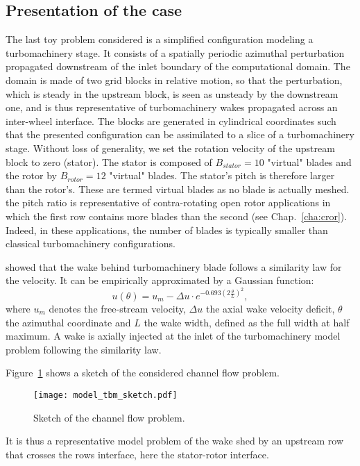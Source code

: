 
\subsection{Presentation of the case}

The last toy problem considered is a simplified 
configuration modeling a turbomachinery 
stage. It consists of a spatially 
periodic azimuthal perturbation propagated downstream 
of the inlet boundary of the computational domain. 
The domain is made of two grid blocks in relative 
motion, so that the perturbation, which is steady 
in the upstream block, is seen as unsteady by the 
downstream one, and is thus representative of 
turbomachinery wakes propagated across an inter-wheel interface.
The blocks are generated in cylindrical
coordinates such that the presented configuration
can be assimilated to a slice of 
a turbomachinery stage.
Without loss of generality, 
we set the rotation velocity of the upstream block to zero (stator). 
The stator is composed of $B_{stator} = 10$
"virtual" blades and the rotor by $B_{rotor} = 12$ "virtual" blades.
The stator's pitch is therefore larger than the rotor's.
These are termed virtual blades as no blade is actually meshed.
the pitch ratio is representative of 
contra-rotating open rotor applications in which 
the first row contains more blades 
than the second (see Chap.~\ref{cha:cror}). Indeed, in
these applications, the number
of blades is typically smaller than classical
turbomachinery configurations.

\citet{Lakshminarayana1980} showed that the wake
behind turbomachinery blade follows a similarity law for the velocity. 
It can be empirically approximated by a Gaussian function:
\begin{equation}
    u (\theta) = u_m - 
        \Delta u \cdot e^{
          -0.693 \left( 2 \frac{\theta}{L} \right) ^ 2},
    \label{eq:similarity}
\end{equation}
where $u_m$ denotes the free-stream velocity, $\Delta u$ the axial wake velocity deficit,
$\theta$ the azimuthal coordinate and $L$ the wake width,
defined as the full width at half maximum.
A wake is axially injected at the inlet of the
turbomachinery model problem following the \citet{Lakshminarayana1980}
similarity law.

Figure~\ref{fig:model_tbm_sketch} shows a sketch
of the considered channel flow problem.
\begin{figure}
  \centering
  \texttt{[image: model\_tbm\_sketch.pdf]}
  \caption{Sketch of the channel flow problem.}
  \label{fig:model_tbm_sketch}
\end{figure}
It is thus a representative model problem of the wake shed
by an upstream row that crosses the rows interface, 
here the stator-rotor interface.

